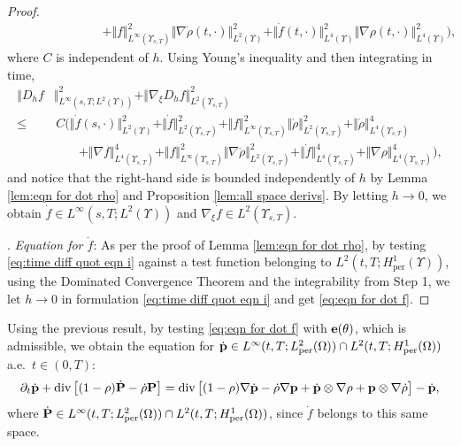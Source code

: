 \documentclass[11pt,a4paper,reqno]{amsart}
\theoremstyle{remark}
\theoremstyle{definition}
\numberwithin{equation}{section}
\newcommand{\per}{\mathrm{per}}
\DeclareMathOperator{\dv}{div}
\renewcommand{\P}{{\bf P}}
\newcommand{\p}{{\bf p}}
\newcommand{\e}{{\bf e}}
\newcommand{\bxi}{\xi}
\begin{document}
\begin{proof}
\begin{equation*}
\begin{aligned}
        & \,\,\,\,\,\,\,\,\,\,\,\,\,\,\,\,\,\,\,\,\,\, \,\,\,\,\,\,\,\,\,\,\,\,\,\,\,\,\, + \Vert f \Vert_{L^\infty(\Upsilon_{s,T})}^2 \Vert \nabla \dot{\rho}(t,\cdot) \Vert^2_{L^2(\Upsilon)} + \Vert \dot{f}(t,\cdot) \Vert^2_{L^4(\Upsilon)}\Vert \nabla \rho(t,\cdot) \Vert^2_{L^4(\Upsilon)} \Big), 
    \end{aligned}
\end{equation*}
where $C$ is independent of $h$. Using Young's inequality and then integrating in time, 
\begin{equation*}
    \begin{aligned}
        \Vert D_h f& \Vert_{L^\infty(s,T;L^2(\Upsilon))}^2 + \Vert \nabla_{\bxi} D_h f \Vert_{L^2(\Upsilon_{s,T})}^2   \\ 
        \leq& \,C\Big( \Vert \dot{f}(s,\cdot) \Vert_{L^2(\Upsilon)}^2 + \Vert \dot{f} \Vert_{L^2(\Upsilon_{s,T})}^2  + \Vert f \Vert_{L^\infty(\Upsilon_{s,T})}^2 \Vert \dot{\rho}\Vert_{L^2(\Upsilon_{s,T})}^2  +  \Vert \dot{\rho} \Vert^4_{L^4(\Upsilon_{s,T})} \\ 
        & \,\,\,\,\,\,\,\,\,\,\,\,  +\Vert \nabla f \Vert^4_{L^4(\Upsilon_{s,T})} + \Vert f \Vert_{L^\infty(\Upsilon_{s,T})}^2 \Vert \nabla \dot{\rho}\Vert^2_{L^2(\Upsilon_{s,T})} + \Vert \dot{f}\Vert^4_{L^4(\Upsilon_{s,T})} + \Vert \nabla \rho\Vert^4_{L^4(\Upsilon_{s,T})} \Big), 
    \end{aligned}
\end{equation*}
and notice that the right-hand side is bounded independently of $h$ by Lemma \ref{lem:eqn for dot rho} and Proposition \ref{lem:all space derivs}. By letting $h \to 0$, we obtain $\dot{f} \in L^\infty(s,T;L^2(\Upsilon))$ and $\nabla_{\bxi} \dot{f} \in L^2(\Upsilon_{s,T})$. 


\smallskip 

. \textit{Equation for $\dot{f}$}: As per the proof of Lemma \ref{lem:eqn for dot rho}, by testing \eqref{eq:time diff quot eqn i} against a test function belonging to $L^2(t,T;H^1_\per(\Upsilon))$, using the Dominated Convergence Theorem and the integrability from Step 1, we let $h\to 0$ in formulation \eqref{eq:time diff quot eqn i} and get \eqref{eq:eqn for dot f}. 
\end{proof}


Using the previous result, by testing \eqref{eq:eqn for dot f} with $\e(\theta)$, which is admissible, we obtain the equation for $\dot{\p} \in L^\infty(t,T;L^2_\per(\Omega)) \cap L^2(t,T;H^1_\per(\Omega))$ a.e.~$t\in(0,T)$: 
\begin{equation}\label{eq:dot p eqn}
    \partial_t \dot{\p} + \dv\big[ (1-\rho)\dot{\P} - \dot{\rho} \P  \big] = \dv \big[  (1-\rho) \nabla \dot{\p} - \dot{\rho} \nabla \p + \dot{\p}\otimes \nabla \rho + \p \otimes \nabla \dot{\rho}   \big] - \dot{\p}, 
\end{equation}
where $\dot{\P} \in L^\infty(t,T;L^2_\per(\Omega)) \cap L^2(t,T;H^1_\per(\Omega))$, since $\dot{f}$ belongs to this same space. 
\end{document}

